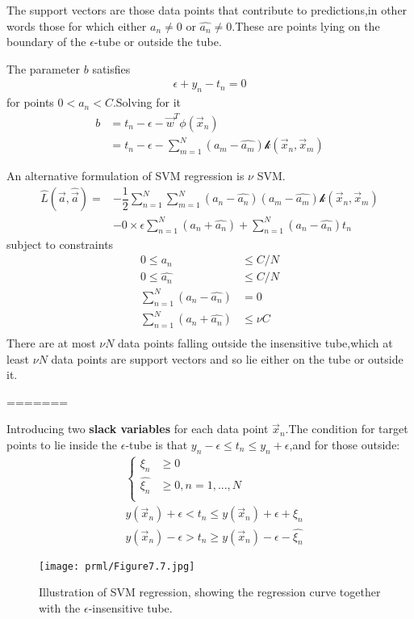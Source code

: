 The support vectors are those data points that contribute to predictions,in other words those for which either $a_n \neq 0$ or $\hat{a_n} \neq 0$.These are points lying on the boundary of the $\epsilon$-tube or outside the tube.

The parameter $b$ satisfies 
\begin{align}
\epsilon+y_n-t_n= 0
\end{align}
for points $0<a_n<C$.Solving for it
\begin{align}
b &= t_n-\epsilon-\vec{w}^T\phi(\vec{x}_n) \\
  &= t_n-\epsilon-\sum_{m=1}^{N}(a_m-\hat{a_m})\mathcal{k}(\vec{x}_n,\vec{x}_m)
\end{align}

An alternative formulation of SVM regression is $\nu$ SVM.
\begin{align}
\hat{L}(\vec{a},\hat{\vec{a}}) =&-\dfrac{1}{2}\sum_{n=1}^{N}\sum_{m=1}^{N}(a_n-\hat{a_n})(a_m-\hat{a_m})\mathcal{k}(\vec{x}_n,\vec{x}_m) \\
&-0\times\epsilon\sum_{n=1}^{N}(a_n+\hat{a_n})+\sum_{n=1}^{N}(a_n-\hat{a_n})t_n
\end{align}
subject to constraints
\begin{align}
0\leq a_n &\leq C/N\\
0\leq \hat{a_n} &\leq C/N \\
\sum_{n=1}^{N}(a_n-\hat{a_n}) &=0 \\
\sum_{n=1}^{N}(a_n+\hat{a_n}) &\leq \nu C \\
\end{align}
There are at most $\nu N$ data points falling outside the insensitive tube,which at least $\nu N$ data points are support vectors and so lie either on the tube or outside it.

=======

Introducing two \textbf{slack variables} for each data point $\vec{x}_n$.The condition for target points to lie inside the $\epsilon$-tube is that $y_n -\epsilon \leq t_n \leq y_n+\epsilon$,and for those outside:
\begin{align}
&\begin{cases}
\xi_n &\geq 0\\
\hat{\xi_n} &\geq 0,n=1,...,N\\
\end{cases}\\
& y(\vec{x}_n)+\epsilon < t_n \leq y(\vec{x}_n)+\epsilon +\xi_n \\
& y(\vec{x}_n)-\epsilon > t_n \geq y(\vec{x}_n)-\epsilon -\hat{\xi_n}
\end{align}
\begin{SCfigure*}
	\caption{Illustration of SVM regression, showing the regression curve together with the $\epsilon$-insensitive tube. }
	\texttt{[image: prml/Figure7.7.jpg]}
\end{SCfigure*}

